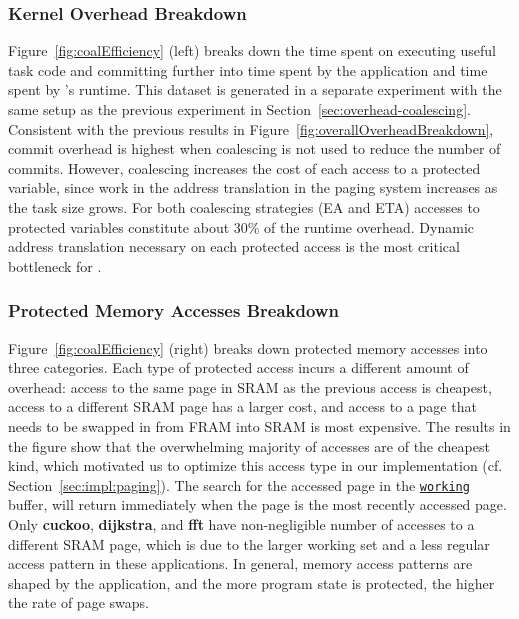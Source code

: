 
\subsubsection{\sys Kernel Overhead Breakdown}

Figure~\ref{fig:coalEfficiency} (left) breaks down the time spent on executing
useful task code and committing further into time spent by the application and
time spent by \sys's runtime.
%
This dataset is generated in a separate experiment with the same setup as the
previous experiment in Section~\ref{sec:overhead-coalescing}.
%
Consistent with the previous results in
Figure~\ref{fig:overallOverheadBreakdown}, commit overhead is highest when
coalescing is not used to reduce the number of commits.
%
However, coalescing increases the cost of each access to a protected variable,
since work in the address translation in the paging system increases as the
task size grows.
%
For both coalescing strategies (EA and ETA) accesses to protected variables
constitute about 30\% of the runtime overhead. Dynamic address translation
necessary on each protected access is the most critical bottleneck for \sys.


\subsubsection{Protected Memory Accesses Breakdown}

Figure~\ref{fig:coalEfficiency} (right) breaks down protected memory accesses
into three categories.
%
Each type of protected access incurs a different amount of overhead: access to
the same page in SRAM as the previous access is cheapest, access to a different
SRAM page has a larger cost, and access to a page that needs to be swapped in
from FRAM into SRAM is most expensive.
%
The results in the figure show that the overwhelming majority of accesses are
of the cheapest kind, which motivated us to optimize this access type in our
implementation (cf. Section~\ref{sec:impl:paging}).
%
The search for the accessed page in the \texttt{\underline{working}} buffer,
will return immediately when the page is the most recently accessed page.
%
Only \textbf{cuckoo}, \textbf{dijkstra}, and \textbf{fft} have non-negligible
number of accesses to a different SRAM page, which is due to the larger working
set and a less regular access pattern in these applications.
%
In general, memory access patterns are shaped by the application, and the more
program state is protected, the higher the rate of page swaps.

